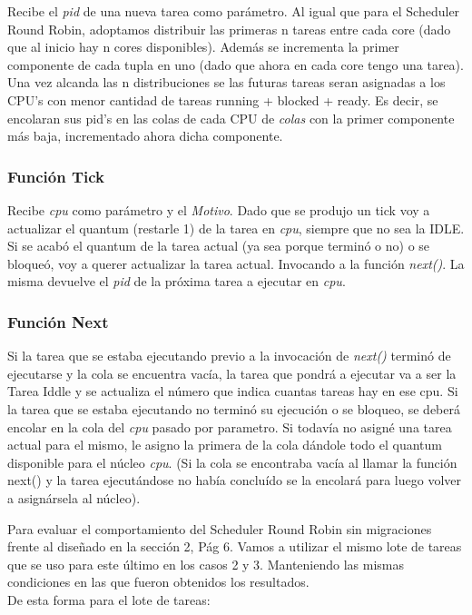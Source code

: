 \documentclass[a4paper]{article}
\begin{document}
Recibe el \emph{pid} de una nueva tarea como par\'ametro. Al igual que para el Scheduler Round Robin, adoptamos distribuir las primeras n tareas entre cada core (dado que al inicio hay n cores disponibles). Además se incrementa la primer componente de cada tupla en uno (dado que ahora en cada core tengo una tarea). Una vez alcanda las n distribuciones se las futuras tareas seran asignadas a los CPU's con menor cantidad de tareas running + blocked + ready.  Es decir, se encolaran sus pid's en las colas de cada CPU de \emph{colas} con la primer componente más baja, incrementado ahora dicha componente.

\subsubsection*{Funci\'on Tick}	

Recibe \emph{cpu} como par\'ametro y el \emph{Motivo}. Dado que se produjo un tick voy a actualizar el quantum (restarle 1) de la tarea en \emph{cpu}, siempre que no sea la IDLE. Si se acab\'o el quantum de la tarea actual (ya sea porque termin\'o o no) o se bloque\'o, voy a querer actualizar la tarea actual. Invocando a la funci\'on \emph{next()}. La misma devuelve el \emph{pid} de la próxima tarea a ejecutar en \emph{cpu}.

\subsubsection*{Funci\'on Next}	
	

Si la tarea que se estaba ejecutando previo a la invocaci\'on de \emph{next()} termin\'o de ejecutarse y la cola se encuentra vac\'ia, la tarea que pondr\'a a ejecutar va a ser la Tarea Iddle y se actualiza el número que indica cuantas tareas hay en ese cpu.
Si la tarea que se estaba ejecutando no termin\'o su ejecuci\'on o se bloqueo, se deber\'a encolar en la cola del \emph{cpu} pasado por parametro.
Si todav\'ia no asign\'e una tarea actual para el mismo, le asigno la primera de la cola d\'andole todo el quantum disponible para el n\'ucleo \emph{cpu}. (Si la cola se encontraba vac\'ia al llamar la funci\'on next() y la tarea ejecut\'andose no hab\'ia conclu\'ido se la encolar\'a para luego volver a asign\'arsela al n\'ucleo).\\
 
\bigskip 
 
Para evaluar el comportamiento del Scheduler Round Robin sin migraciones frente al diseñado en la sección 2, Pág 6. Vamos a utilizar el mismo lote de tareas que se uso para este último en los casos 2 y 3. Manteniendo las mismas condiciones en las que fueron obtenidos los resultados.\\
De esta forma para el lote de tareas:
 
\end{document}
